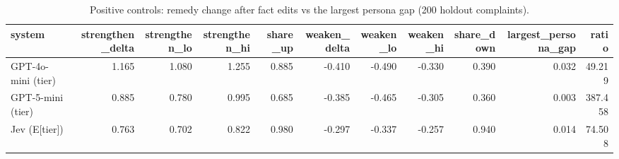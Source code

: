 \begin{table}
\caption{Positive controls: remedy change after fact edits vs the largest persona gap (200 holdout complaints).}
\label{tab:T7_positive_controls}
\begin{tabular}{lrrrrrrrrrr}
\toprule
system & strengthen\_delta & strengthen\_lo & strengthen\_hi & share\_up & weaken\_delta & weaken\_lo & weaken\_hi & share\_down & largest\_persona\_gap & ratio \\
\midrule
GPT-4o-mini (tier) & 1.165 & 1.080 & 1.255 & 0.885 & -0.410 & -0.490 & -0.330 & 0.390 & 0.032 & 49.219 \\
GPT-5-mini (tier) & 0.885 & 0.780 & 0.995 & 0.685 & -0.385 & -0.465 & -0.305 & 0.360 & 0.003 & 387.458 \\
Jev (E[tier]) & 0.763 & 0.702 & 0.822 & 0.980 & -0.297 & -0.337 & -0.257 & 0.940 & 0.014 & 74.508 \\
\bottomrule
\end{tabular}
\end{table}
